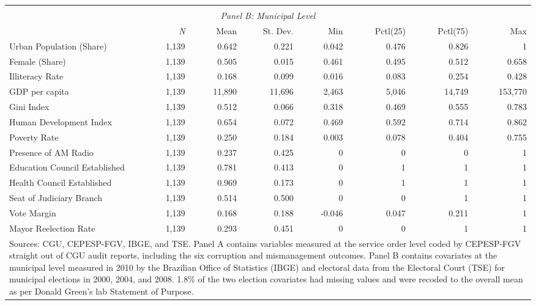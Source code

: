 \begin{table}[!htbp]
\begin{tabular}{lrrrrrrr}
  \multicolumn{8}{c}{}\\
  \multicolumn{8}{c}{\emph{Panel B: Municipal Level}} \T \B \\
  \hline
  & \multicolumn{1}{r}{\emph{N}} & \multicolumn{1}{r}{Mean} & \multicolumn{1}{r}{St. Dev.} & \multicolumn{1}{r}{Min} & \multicolumn{1}{r}{Pctl(25)} & \multicolumn{1}{r}{Pctl(75)} & \multicolumn{1}{r}{Max} \T \B \\
  \hline
  Urban Population (Share)      & 1,139 & 0.642 & 0.221 & 0.042 & 0.476 & 0.826 & 1       \T \B \\
  Female (Share)                & 1,139 & 0.505 & 0.015 & 0.461 & 0.495 & 0.512 & 0.658   \T \B \\
  Illiteracy Rate               & 1,139 & 0.168 & 0.099 & 0.016 & 0.083 & 0.254 & 0.428   \T \B \\
  GDP per capita                & 1,139 & 11,890& 11,696& 2,463 & 5,046 & 14,749& 153,770 \T \B \\
  Gini Index                    & 1,139 & 0.512 & 0.066 & 0.318 & 0.469 & 0.555 & 0.783   \T \B \\
  Human Development Index       & 1,139 & 0.654 & 0.072 & 0.469 & 0.592 & 0.714 & 0.862   \T \B \\
  Poverty Rate                  & 1,139 & 0.250 & 0.184 & 0.003 & 0.078 & 0.404 & 0.755   \T \B \\
  Presence of AM Radio          & 1,139 & 0.237 & 0.425 & 0     & 0     & 0     & 1       \T \B \\
  Education Council Established & 1,139 & 0.781 & 0.413 & 0     & 1     & 1     & 1       \T \B \\
  Health Council Established    & 1,139 & 0.969 & 0.173 & 0     & 1     & 1     & 1       \T \B \\
  Seat of Judiciary Branch      & 1,139 & 0.514 & 0.500 & 0     & 0     & 1     & 1       \T \B \\
  Vote Margin                   & 1,139 & 0.168 & 0.188 & -0.046& 0.047 & 0.211 & 1       \T \B \\
  Mayor Reelection Rate         & 1,139 & 0.293 & 0.451 & 0     & 0     & 1     & 1       \T \B \\
  \hline

  \hline
  \multicolumn{8}{p{.93\textwidth}}{\footnotesize Sources: CGU, CEPESP-FGV, IBGE, and TSE. Panel A contains variables measured at the service order level coded by CEPESP-FGV straight out of CGU audit reports, including the six corruption and mismanagement outcomes. Panel B contains covariates at the municipal level measured in 2010 by the Brazilian Office of Statistics (IBGE) and electoral data from the Electoral Court (TSE) for municipal elections in 2000, 2004, and 2008. 1.8\% of the two election covariates had missing values and were recoded to the overall mean as per Donald Green's lab Statement of Purpose.} \T
  \end{tabular}
\end{table}